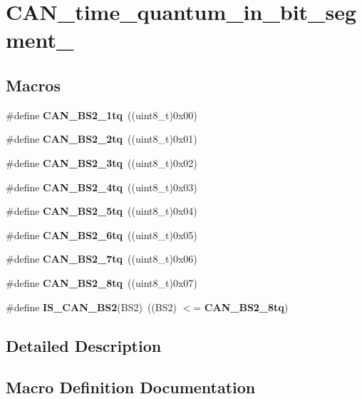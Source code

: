 \section{C\+A\+N\+\_\+time\+\_\+quantum\+\_\+in\+\_\+bit\+\_\+segment\+\_}
\label{group__CAN__time__quantum__in__bit__segment__2}
\subsection*{Macros}
\begin{DoxyCompactItemize}
\item 
\#define \textbf{ C\+A\+N\+\_\+\+B\+S2\+\_\+1tq}~((uint8\+\_\+t)0x00)
\item 
\#define \textbf{ C\+A\+N\+\_\+\+B\+S2\+\_\+2tq}~((uint8\+\_\+t)0x01)
\item 
\#define \textbf{ C\+A\+N\+\_\+\+B\+S2\+\_\+3tq}~((uint8\+\_\+t)0x02)
\item 
\#define \textbf{ C\+A\+N\+\_\+\+B\+S2\+\_\+4tq}~((uint8\+\_\+t)0x03)
\item 
\#define \textbf{ C\+A\+N\+\_\+\+B\+S2\+\_\+5tq}~((uint8\+\_\+t)0x04)
\item 
\#define \textbf{ C\+A\+N\+\_\+\+B\+S2\+\_\+6tq}~((uint8\+\_\+t)0x05)
\item 
\#define \textbf{ C\+A\+N\+\_\+\+B\+S2\+\_\+7tq}~((uint8\+\_\+t)0x06)
\item 
\#define \textbf{ C\+A\+N\+\_\+\+B\+S2\+\_\+8tq}~((uint8\+\_\+t)0x07)
\item 
\#define \textbf{ I\+S\+\_\+\+C\+A\+N\+\_\+\+B\+S2}(B\+S2)~((B\+S2) $<$= \textbf{ C\+A\+N\+\_\+\+B\+S2\+\_\+8tq})
\end{DoxyCompactItemize}


\subsection{Detailed Description}


\subsection{Macro Definition Documentation}
\mbox{\label{group__CAN__time__quantum__in__bit__segment__2_gad9af25a3f61df7b09b8d6a5e81d8027e}} 
